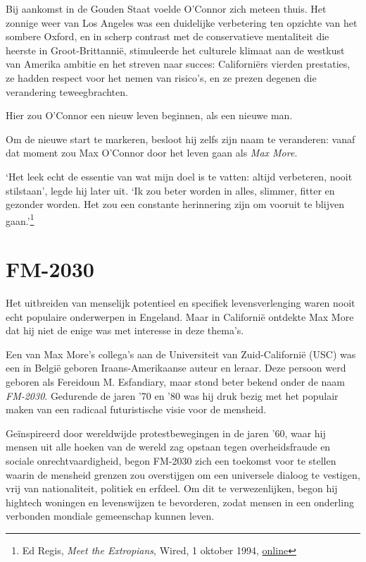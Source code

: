 \documentclass[
  a5paper,
  smalldemyvopaper,11pt,twoside,onecolumn,openright,extrafontsizes,
hidelinks]{memoir}
\begin{document}
Bij aankomst in de Gouden Staat voelde O'Connor zich meteen thuis. Het
zonnige weer van Los Angeles was een duidelijke verbetering ten opzichte
van het sombere Oxford, en in scherp contrast met de conservatieve
mentaliteit die heerste in Groot-Brittannië, stimuleerde het culturele
klimaat aan de westkust van Amerika ambitie en het streven naar succes:
Californiërs vierden prestaties, ze hadden respect voor het nemen van
risico's, en ze prezen degenen die verandering teweegbrachten.

Hier zou O'Connor een nieuw leven beginnen, als een nieuwe man.

Om de nieuwe start te markeren, besloot hij zelfs zijn naam te
veranderen: vanaf dat moment zou Max O'Connor door het leven gaan als
\emph{Max More}.

`Het leek echt de essentie van wat mijn doel is te vatten: altijd
verbeteren, nooit stilstaan', legde hij later uit. `Ik zou beter worden
in alles, slimmer, fitter en gezonder worden. Het zou een constante
herinnering zijn om vooruit te blijven gaan.'\footnote{Ed Regis,
  \emph{Meet the Extropians}, Wired, 1 oktober 1994,
  \href{https://www.wired.com/1994/10/extropians/}{online}}

\section{FM-2030}\label{fm-2030}

Het uitbreiden van menselijk potentieel en specifiek levensverlenging
waren nooit echt populaire onderwerpen in Engeland. Maar in Californië
ontdekte Max More dat hij niet de enige was met interesse in deze
thema's.

Een van Max More's collega's aan de Universiteit van Zuid-Californië
(USC) was een in België geboren Iraans-Amerikaanse auteur en leraar.
Deze persoon werd geboren als Fereidoun M. Esfandiary, maar stond beter
bekend onder de naam \emph{FM-2030}. Gedurende de jaren '70 en '80 was
hij druk bezig met het populair maken van een radicaal futuristische
visie voor de mensheid.

Geïnspireerd door wereldwijde protestbewegingen in de jaren '60, waar
hij mensen uit alle hoeken van de wereld zag opstaan tegen
overheidsfraude en sociale onrechtvaardigheid, begon FM-2030 zich een
toekomst voor te stellen waarin de mensheid grenzen zou overstijgen om
een universele dialoog te vestigen, vrij van nationaliteit, politiek en
erfdeel. Om dit te verwezenlijken, begon hij hightech woningen en
levenswijzen te bevorderen, zodat mensen in een onderling verbonden
mondiale gemeenschap kunnen leven.
\end{document}
